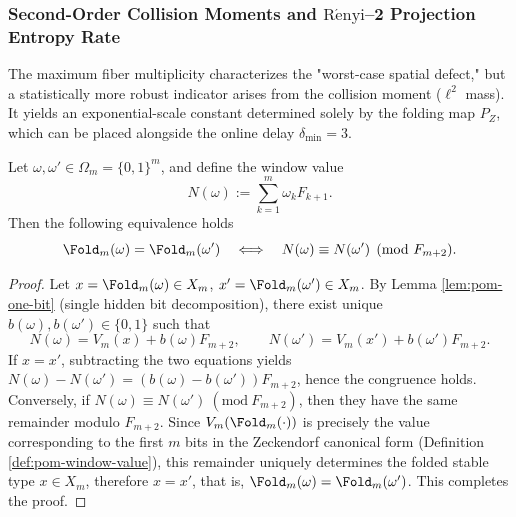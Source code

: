 \subsubsection{Second-Order Collision Moments and \texorpdfstring{$\mathrm{R\acute{e}nyi}$}{Renyi}--2 Projection Entropy Rate}\label{subsec:pom-s2}
The maximum fiber multiplicity characterizes the "worst-case spatial defect," but a statistically more robust indicator arises from the collision moment (\(\ell^2\) mass). It yields an exponential-scale constant determined solely by the folding map \(P_Z\), which can be placed alongside the online delay \(\delta_{\min}=3\).

\begin{lemma}\label{lem:pom-fold-congruence}
Let \(\omega,\omega'\in\Omega_m=\{0,1\}^m\), and define the window value
$$
N(\omega):=\sum_{k=1}^m \omega_k F_{k+1}.
$$
Then the following equivalence holds
$$
\Fold_m(\omega)=\Fold_m(\omega')
\quad\Longleftrightarrow\quad
N(\omega)\equiv N(\omega')\pmod{F_{m+2}}.
$$
\end{lemma}
\begin{proof}
Let \(x=\Fold_m(\omega)\in X_m\), \(x'=\Fold_m(\omega')\in X_m\). By Lemma \ref{lem:pom-one-bit} (single hidden bit decomposition), there exist unique \(b(\omega),b(\omega')\in\{0,1\}\) such that
$$
N(\omega)=V_m(x)+b(\omega)F_{m+2},\qquad
N(\omega')=V_m(x')+b(\omega')F_{m+2}.
$$
If \(x=x'\), subtracting the two equations yields \(N(\omega)-N(\omega')=(b(\omega)-b(\omega'))F_{m+2}\), hence the congruence holds.
Conversely, if \(N(\omega)\equiv N(\omega')\ (\mathrm{mod}\ F_{m+2})\), then they have the same remainder modulo \(F_{m+2}\). Since \(V_m(\Fold_m(\cdot))\) is precisely the value corresponding to the first \(m\) bits in the Zeckendorf canonical form (Definition \ref{def:pom-window-value}), this remainder uniquely determines the folded stable type \(x\in X_m\), therefore \(x=x'\), that is, \(\Fold_m(\omega)=\Fold_m(\omega')\). This completes the proof.
\end{proof}

